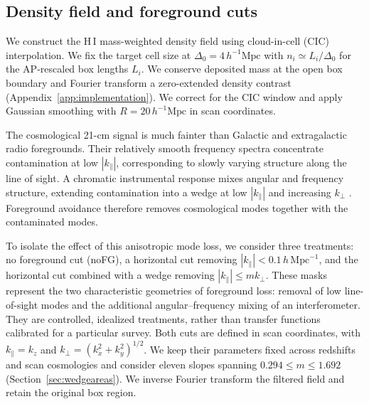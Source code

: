 \subsection{Density field and foreground cuts}
We construct the H\,I mass-weighted density field using cloud-in-cell (CIC) interpolation. We fix the target cell size at $\Delta_0=4\,h^{-1}\mathrm{Mpc}$ with $n_i\simeq L_i/\Delta_0$ for the AP-rescaled box lengths $L_i$. We conserve deposited mass at the open box boundary and Fourier transform a zero-extended density contrast (Appendix~\ref{app:implementation}). We correct for the CIC window \citep{Jing2005} and apply Gaussian smoothing with $R=20\,h^{-1}\mathrm{Mpc}$ in scan coordinates.

The cosmological 21-cm signal is much fainter than Galactic and extragalactic radio foregrounds. Their relatively smooth frequency spectra concentrate contamination at low $|k_\parallel|$, corresponding to slowly varying structure along the line of sight. A chromatic instrumental response mixes angular and frequency structure, extending contamination into a wedge at low $|k_\parallel|$ and increasing $k_\perp$ \citep{Datta2010BrightSourceWedge,Morales2012ForegroundShapes,SeoHirata2016Wedge}. Foreground avoidance therefore removes cosmological modes together with the contaminated modes.

To isolate the effect of this anisotropic mode loss, we consider three treatments: no foreground cut (noFG), a horizontal cut removing $|k_\parallel|<0.1\,h\,\mathrm{Mpc}^{-1}$, and the horizontal cut combined with a wedge removing $|k_\parallel|\le m k_\perp$. These masks represent the two characteristic geometries of foreground loss: removal of low line-of-sight modes and the additional angular--frequency mixing of an interferometer. They are controlled, idealized treatments, rather than transfer functions calibrated for a particular survey. Both cuts are defined in scan coordinates, with $k_\parallel=k_z$ and $k_\perp=(k_x^2+k_y^2)^{1/2}$. We keep their parameters fixed across redshifts and scan cosmologies and consider eleven slopes spanning $0.294\le m\le1.692$ (Section~\ref{sec:wedgeareas}). We inverse Fourier transform the filtered field and retain the original box region.


